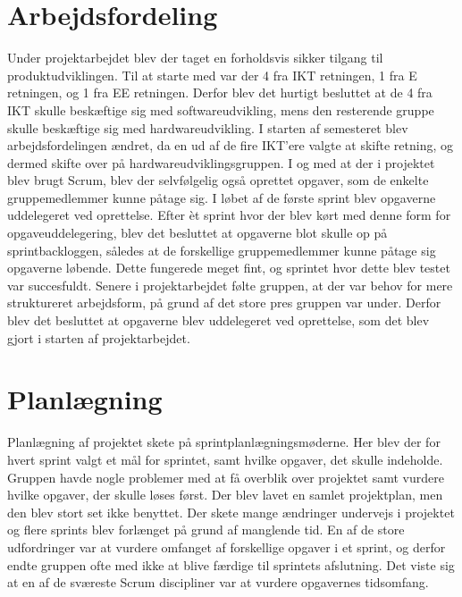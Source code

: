 \section{Arbejdsfordeling}
Under projektarbejdet blev der taget en forholdsvis sikker tilgang til produktudviklingen. Til at starte med var der 4 fra IKT retningen, 1 fra E retningen, og 1 fra EE retningen. Derfor blev det hurtigt besluttet at de 4 fra IKT skulle beskæftige sig med softwareudvikling, mens den resterende gruppe skulle beskæftige sig med hardwareudvikling. I starten af semesteret blev arbejdsfordelingen ændret, da en ud af de fire IKT’ere valgte at skifte retning, og dermed skifte over på hardwareudviklingsgruppen. I og med at der i projektet blev brugt Scrum, blev der selvfølgelig også oprettet opgaver, som de enkelte gruppemedlemmer kunne påtage sig. I løbet af de første sprint blev opgaverne uddelegeret ved oprettelse. Efter èt 
sprint hvor der blev kørt med denne form for opgaveuddelegering, blev det besluttet at opgaverne blot skulle op på sprintbackloggen, således at de forskellige gruppemedlemmer kunne påtage sig opgaverne løbende. Dette fungerede meget fint, og sprintet hvor dette blev testet var succesfuldt. Senere i projektarbejdet følte gruppen, at der var behov for mere struktureret arbejdsform, på grund af det store pres gruppen var under. Derfor blev det besluttet at opgaverne blev uddelegeret ved oprettelse, som det blev gjort i starten af projektarbejdet.


\section{Planlægning}
Planlægning af projektet skete på sprintplanlægningsmøderne. Her blev der for hvert sprint valgt et mål for sprintet, samt hvilke opgaver, det skulle indeholde. Gruppen havde nogle problemer med at få overblik over projektet samt vurdere hvilke opgaver, der skulle løses først. Der blev lavet en samlet projektplan, men den blev stort set ikke benyttet.
Der skete mange ændringer undervejs i projektet og flere sprints blev forlænget på grund af manglende tid. En af de store udfordringer var at vurdere omfanget af forskellige opgaver i et sprint, og derfor endte gruppen ofte med ikke at blive færdige til sprintets afslutning. Det viste sig at en af de sværeste Scrum discipliner var at vurdere opgavernes tidsomfang. 

